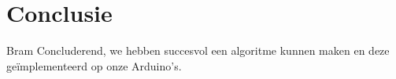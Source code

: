 \documentclass[a4paper,10pt]{article}
\begin{document}
\section{Conclusie}\label{sec:conclusie}
Bram
Concluderend, we hebben succesvol een algoritme kunnen maken en deze geïmplementeerd op onze Arduino's. 

% 



\end{document}
